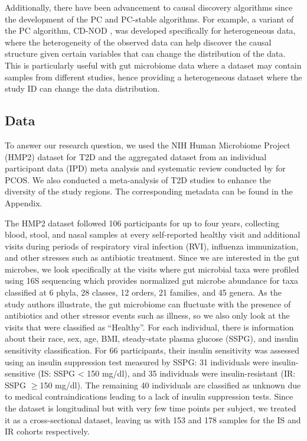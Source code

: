 \documentclass[12pt,letterpaper]{article}
\begin{document}
Additionally, there have been advancement to causal discovery algorithms since the development of the PC and PC-stable algorithms. For example, a variant of the PC algorithm, CD-NOD \citep{huang2019cdnod}, was developed specifically for heterogeneous data, where the heterogeneity of the observed data can help discover the causal structure given certain variables that can change the distribution of the data. This is particularly useful with gut microbiome data where a dataset may contain samples from different studies, hence providing a heterogeneous dataset where the study ID can change the data distribution. 

\subsection{Data}

To answer our research question, we used the NIH Human Microbiome Project (HMP2) dataset \citep{zhou2019t2d} for T2D and the aggregated dataset from an individual participant data (IPD) meta analysis and systematic review conducted by \citep{yang2024pcos} for PCOS. We also conducted a meta-analysis of T2D studies to enhance the diversity of the study regions. The corresponding metadata can be found in the Appendix.

The HMP2 dataset \citep{zhou2019t2d} followed 106 participants for up to four years, collecting blood, stool, and nasal samples at every self-reported healthy visit and additional visits during periods of respiratory viral infection (RVI), influenza immunization, and other stresses such as antibiotic treatment. Since we are interested in the gut microbes, we look specifically at the visits where gut microbial taxa were profiled using 16S sequencing which provides normalized gut microbe abundance for taxa classified at 6 phyla, 28 classes, 12 orders, 21 families, and 45 genera. As the study authors illustrate, the gut microbiome can fluctuate with the presence of antibiotics and other stressor events such as illness, so we also only look at the visits that were classified as “Healthy”. For each individual, there is information about their race, sex, age, BMI, steady-state plasma glucose (SSPG), and insulin sensitivity classification. For 66 participants, their insulin sensitivity was assessed using an insulin suppression test measured by SSPG: 31 individuals were insulin-sensitive (IS: SSPG < 150 mg/dl), and 35 individuals were insulin-resistant (IR: SSPG $\geq$150 mg/dl). The remaining 40 individuals are classified as unknown due to medical contraindications leading to a lack of insulin suppression tests. Since the dataset is longitudinal but with very few time points per subject, we treated it as a cross-sectional dataset, leaving us with 153 and 178 samples for the IS and IR cohorts respectively.
\end{document}
